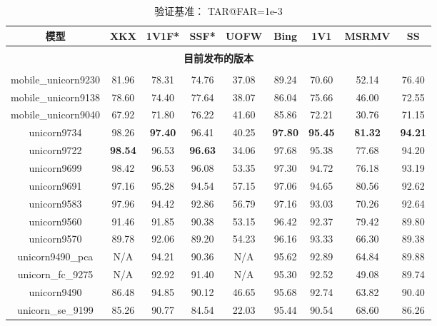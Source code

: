 \documentclass[a4paper, 11pt, UTF8]{ctexart}%
\begin{document}
\begin{table}[h]
\caption{验证基准： TAR@FAR=1e-3}
\label{table:VB_T@F1e-3}
\begin{center}
\begin{tabular}{ccccccccc}
\multicolumn{1}{c}{\bf 模型}  &\multicolumn{1}{c}{\bf XKX} &\multicolumn{1}{c}{\bf 1V1F*} &\multicolumn{1}{c}{\bf SSF*} &\multicolumn{1}{c}{\bf UOFW} &\multicolumn{1}{c}{\bf Bing} &\multicolumn{1}{c}{\bf 1V1} &\multicolumn{1}{c}{\bf MSRMV} &\multicolumn{1}{c}{\bf SS}
\\ \hline \\
\multicolumn{9}{c}{\bf 目前发布的版本}\\
\\
mobile\_unicorn9230&  81.96 & 78.31 & 74.76 & 37.08 & 89.24 & 70.60 & 52.14 & 76.40 \\
\rowcolor{t_gary}
mobile\_unicorn9138&  78.60 & 74.40 & 77.64 & 38.07 & 86.04 & 75.66 & 46.00 & 72.55 \\
mobile\_unicorn9040&  67.92 & 71.80 & 76.22 & 41.60 & 85.86 & 72.21 & 30.76 & 71.15 \\
\rowcolor{t_gary}
unicorn9734&  98.26 & {\color{red} \bf 97.40}& 96.41 & 40.25 & {\color{red} \bf 97.80} & {\color{red} \bf 95.45} & {\color{red} \bf 81.32} & {\color{red} \bf 94.21} \\
unicorn9722&  {\color{red} \bf 98.54} & 96.53& {\color{red} \bf 96.63} & 34.06 & 97.68 & 95.38 & 77.68 & 94.20 \\
\rowcolor{t_gary}
unicorn9699&  98.42 & 96.53& 96.08 & 53.35 & 97.30 & 94.72 & 76.18 & 93.19 \\
unicorn9691&  97.16 & 95.28& 94.54 & 57.15 & 97.06 & 94.65 & 80.56 & 92.62 \\
\rowcolor{t_gary}
unicorn9583&  97.96 & 94.42 & 92.86 & 56.79 & 97.16 & 93.03 & 70.26 & 92.64 \\
unicorn9560&  91.46 & 91.85 & 90.38 & 53.15 & 96.42 & 92.37 & 79.42 & 89.80 \\
\rowcolor{t_gary}
unicorn9570&  89.78 & 92.06 & 89.20 & 54.23 & 96.16 & 93.33 & 66.30 & 89.38 \\
unicorn9490\_pca &  N/A & 94.21 & 90.36 & N/A & 95.62 & 92.89 & 64.84 & 89.88 \\
\rowcolor{t_gary}
unicorn\_fc\_9275 &  N/A & 92.92 & 91.40 & N/A & 95.30 & 92.52 & 49.08 & 89.74 \\
unicorn9490 &  86.48 & 94.85 & 90.12 & 46.65 & 95.68 & 92.74 & 63.82 & 90.40 \\
\rowcolor{t_gary}
unicorn\_se\_9199 &  85.26 & 90.77 & 84.54 & 22.03 & 95.44 & 90.54 & 68.60 & 86.26 \\

\end{tabular}
\end{center}
\end{table}
\end{document}

